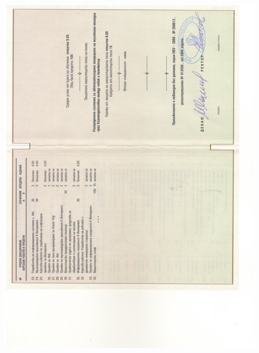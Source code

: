 \documentclass[bulgarian,a4paper]{europasscv}
\begin{document}
\includegraphics[width=\textwidth,height=\textheight,keepaspectratio]{DiplomaNBU2008_4}
\end{document}
